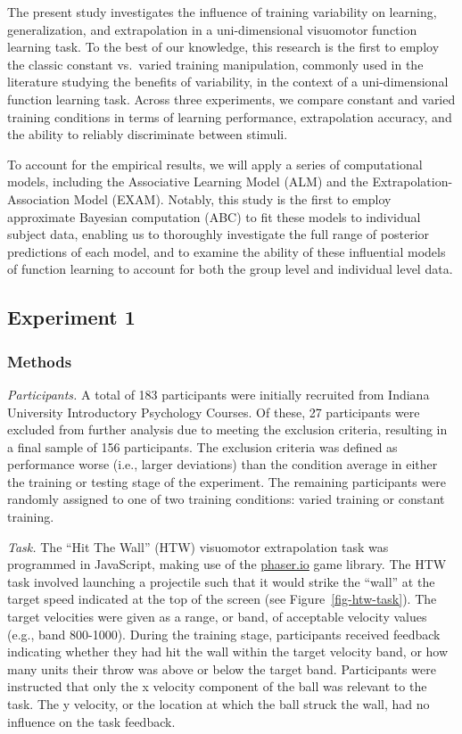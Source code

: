 \documentclass[
  11pt,
  letterpaper,
]{article}
\begin{document}
The present study investigates the influence of training variability on
learning, generalization, and extrapolation in a uni-dimensional
visuomotor function learning task. To the best of our knowledge, this
research is the first to employ the classic constant vs.~varied training
manipulation, commonly used in the literature studying the benefits of
variability, in the context of a uni-dimensional function learning task.
Across three experiments, we compare constant and varied training
conditions in terms of learning performance, extrapolation accuracy, and
the ability to reliably discriminate between stimuli.

To account for the empirical results, we will apply a series of
computational models, including the Associative Learning Model (ALM) and
the Extrapolation-Association Model (EXAM). Notably, this study is the
first to employ approximate Bayesian computation (ABC) to fit these
models to individual subject data, enabling us to thoroughly investigate
the full range of posterior predictions of each model, and to examine
the ability of these influential models of function learning to account
for both the group level and individual level data.

\subsection{Experiment 1}\label{experiment-1-1}

\subsubsection{Methods}\label{methods-2}

\emph{Participants.} A total of 183 participants were initially
recruited from Indiana University Introductory Psychology Courses. Of
these, 27 participants were excluded from further analysis due to
meeting the exclusion criteria, resulting in a final sample of 156
participants. The exclusion criteria was defined as performance worse
(i.e., larger deviations) than the condition average in either the
training or testing stage of the experiment. The remaining participants
were randomly assigned to one of two training conditions: varied
training or constant training.

\emph{Task.} The ``Hit The Wall'' (HTW) visuomotor extrapolation task
was programmed in JavaScript, making use of the
\href{https://phaser.io/}{phaser.io} game library. The HTW task involved
launching a projectile such that it would strike the ``wall'' at the
target speed indicated at the top of the screen (see
Figure~\ref{fig-htw-task}). The target velocities were given as a range,
or band, of acceptable velocity values (e.g., band 800-1000). During the
training stage, participants received feedback indicating whether they
had hit the wall within the target velocity band, or how many units
their throw was above or below the target band. Participants were
instructed that only the x velocity component of the ball was relevant
to the task. The y velocity, or the location at which the ball struck
the wall, had no influence on the task feedback.
\end{document}
